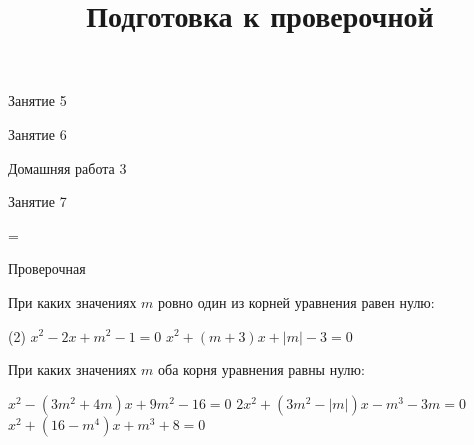 \begin{class}[number=5]
	\begin{listofex}
		\item Занятие 5
	\end{listofex}
\end{class}

\begin{class}[number=6]
	\begin{listofex}
		\item Занятие 6
	\end{listofex}
\end{class}

\begin{homework}[number=3]
	\begin{listofex}
		\item Домашняя работа 3
	\end{listofex}
\end{homework}

\begin{class}[number=7]
	\title{Подготовка к проверочной}
	\begin{listofex}
		\item Занятие 7
	\end{listofex}
\end{class}

=%
\begin{exam}
	\begin{listofex}
		\item Проверочная
	\end{listofex}
\end{exam}

\begin{consultation}
	\begin{listofex}
		\item При каких значениях \(m\) ровно один из корней уравнения равен нулю:
		\begin{tasks}(2)
			\task \( x^2-2x+m^2-1=0 \)
			\task \( x^2+(m+3)x+|m|-3=0 \)
		\end{tasks}
		\item При каких значениях \(m\) оба корня уравнения равны нулю:
		\begin{tasks}
			\task \( x^2-(3m^2+4m)x+9m^2-16=0 \)
			\task \( 2x^2+(3m^2-|m|)x-m^3-3m=0 \)
			\task \( x^2+(16-m^4)x+m^3+8=0 \)
		\end{tasks}
		
	\end{listofex}
\end{consultation}

